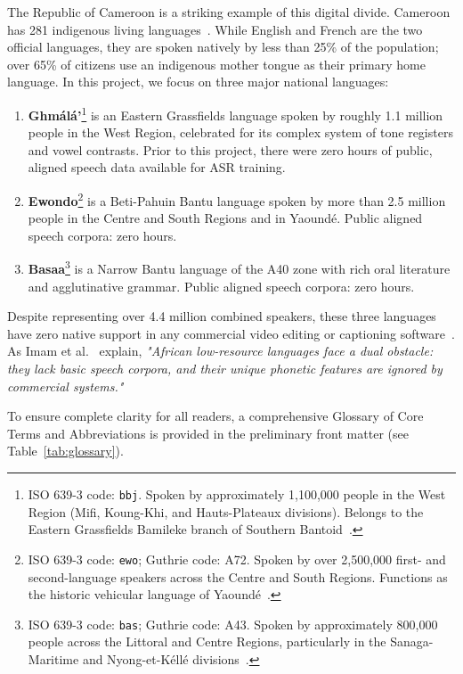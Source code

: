 \documentclass[a4paper,11pt]{article}
\begin{document}
The Republic of Cameroon is a striking example of this digital divide. Cameroon has 281 indigenous living languages~\cite{lewis2009ethnologue, eberhard2021ethnologue}. While English and French are the two official languages, they are spoken natively by less than 25\% of the population; over 65\% of citizens use an indigenous mother tongue as their primary home language. In this project, we focus on three major national languages:
\begin{enumerate}
    \item \textbf{Gh\textopeno m\'al\'a'}\footnote{ISO 639-3 code: \texttt{bbj}. Spoken by approximately 1,100,000 people in the West Region (Mifi, Koung-Khi, and Hauts-Plateaux divisions). Belongs to the Eastern Grassfields Bamileke branch of Southern Bantoid~\cite{watters2007bamileke}.} is an Eastern Grassfields language spoken by roughly 1.1 million people in the West Region, celebrated for its complex system of tone registers and vowel contrasts. Prior to this project, there were zero hours of public, aligned speech data available for ASR training.
    \item \textbf{Ewondo}\footnote{ISO 639-3 code: \texttt{ewo}; Guthrie code: A72. Spoken by over 2,500,000 first- and second-language speakers across the Centre and South Regions. Functions as the historic vehicular language of Yaound\'e~\cite{essono2010ewondo}.} is a Beti-Pahuin Bantu language spoken by more than 2.5 million people in the Centre and South Regions and in Yaound\'e. Public aligned speech corpora: zero hours.
    \item \textbf{Basaa}\footnote{ISO 639-3 code: \texttt{bas}; Guthrie code: A43. Spoken by approximately 800,000 people across the Littoral and Centre Regions, particularly in the Sanaga-Maritime and Nyong-et-K\'ell\'e divisions~\cite{njiki2015grammaire, bitjaa2017dialectologie}.} is a Narrow Bantu language of the A40 zone with rich oral literature and agglutinative grammar. Public aligned speech corpora: zero hours.
\end{enumerate}

Despite representing over 4.4 million combined speakers, these three languages have zero native support in any commercial video editing or captioning software~\cite{hedren2022challenges, imam2025automatic}. As Imam et al.~\cite{imam2025automatic} explain, \textit{"African low-resource languages face a dual obstacle: they lack basic speech corpora, and their unique phonetic features are ignored by commercial systems."}

To ensure complete clarity for all readers, a comprehensive Glossary of Core Terms and Abbreviations is provided in the preliminary front matter (see Table~\ref{tab:glossary}).
\end{document}
